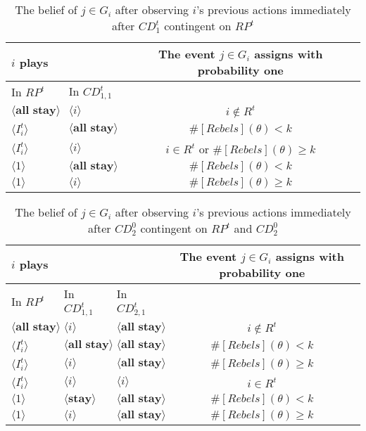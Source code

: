\documentclass[12pt,letter]{article}
\theoremstyle{definition}
\theoremstyle{remark}
\theoremstyle{claim}
\begin{document}
\begin{table}[!htbp]
\caption{The belief of $j\in G_i$ after observing $i$'s previous actions immediately after $CD^t_1$ {contingent} on $RP^t$ }
\label{Table_blf_up_cdt1}
\begin{center}
\begin{tabular}{l  l | c}
 $i$ plays	&			  & The event $j\in G_i$ assigns with probability one \\
\hline
\hline
	  In $RP^t$	 	&		In $CD^t_{1,1}$	&				  \\
\hline
$\langle \textbf{all stay} \rangle$  & $\langle i \rangle$	&    $i\notin R^t$  \\
$\langle I^t_{i} \rangle$  & $\langle \textbf{all stay} \rangle$	&    $\#[Rebels](\theta)< k$ \\
$\langle I^t_{i} \rangle$  & $\langle i \rangle$	&    $i\in R^t$  or $\#[Rebels](\theta)\geq k$ \\
$\langle 1 \rangle$  & $\langle \textbf{all stay} \rangle$	&	  $\#[Rebels](\theta)< k$    \\
$\langle 1 \rangle$  & $\langle i \rangle$	&	  $\#[Rebels](\theta)\geq k$  \\
  \hline
\end{tabular}
\end{center}
\end{table}

\begin{table}[!htbp]
\caption{The belief of $j\in G_i$ after observing $i$'s previous actions immediately after $CD^0_{2}$ {contingent} on $RP^t$ and $CD^0_{2}$ }
\label{Table_blf_up_cdt2}
\begin{center}
\begin{tabular}{l  l l | c}
 $i$ plays  	&		&  	  &The event $j\in G_i$ assigns with probability one\\
\hline
\hline
In $RP^t$			&	In $CD^t_{1,1}$			&			In $CD^t_{2,1}$		&   \\
\hline
$\langle \textbf{all stay} \rangle$  & $\langle i \rangle$	&  $\langle \textbf{all stay} \rangle$ &  $i\notin R^t$  \\
$\langle I^t_{i} \rangle$  & $\langle \textbf{all stay} \rangle$	&  $\langle \textbf{all stay} \rangle$ &  $\#[Rebels](\theta)< k$ \\
$\langle I^t_{i} \rangle$  & $\langle i \rangle$	&  $\langle \textbf{all stay} \rangle$ &  $\#[Rebels](\theta)\geq k$ \\
$\langle I^t_{i} \rangle$  & $\langle i \rangle$	&  $\langle i \rangle$ &  $i\in R^t$ \\
$\langle 1 \rangle$  & $\langle \textbf{stay} \rangle$	&	$\langle \textbf{all stay} \rangle$ &  $\#[Rebels](\theta)< k$    \\
$\langle 1 \rangle$  & $\langle i \rangle$	&	$\langle \textbf{all stay} \rangle$ &  $\#[Rebels](\theta)\geq k$  \\
  \hline
\end{tabular}
\end{center}
\end{table}
\end{document}
